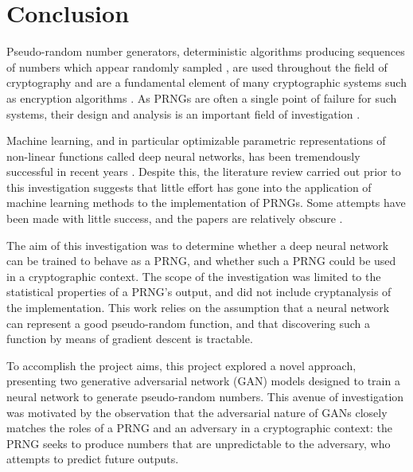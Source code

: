 \documentclass[12pt, titlepage]{report}
\theoremstyle{definition}
\begin{document}
\chapter{Conclusion}\label{chapter:conclusion}
Pseudo-random number generators, deterministic algorithms producing sequences of numbers which appear randomly sampled \cite[p. 7]{barker2007recommendation}, are used throughout the field of cryptography and are a fundamental element of many cryptographic systems such as encryption algorithms  \cite[p. 169]{menezes1996handbook} \cite[p. 1]{kelsey1998cryptanalytic}. As PRNGs are often a single point of failure for such systems, their design and analysis is an important field of investigation \cite[p. 2]{kelsey1998cryptanalytic} \cite{deng2017developments}. 

Machine learning, and in particular optimizable parametric representations of non-linear functions called deep neural networks, has been tremendously successful in recent years \cite[p. 24-29]{russel2009artificial}. Despite this, the literature review carried out prior to this investigation suggests that little effort has gone into the application of machine learning methods to the implementation of PRNGs. Some attempts have been made with little success, and the papers are relatively obscure \cite{desai2011pseudo} \cite{desai2012pseudo} \cite{tirdad2010hopfield}.

The aim of this investigation was to determine whether a deep neural network can be trained to behave as a PRNG, and whether such a PRNG could be used in a cryptographic context. The scope of the investigation was limited to the statistical properties of a PRNG's output, and did not include cryptanalysis of the implementation. This work relies on the assumption that a neural network can represent a good pseudo-random function, and that discovering such a function by means of gradient descent is tractable. 

To accomplish the project aims, this project explored a novel approach, presenting two generative adversarial network (GAN) models designed to train a neural network to generate pseudo-random numbers. This avenue of investigation was motivated by the observation that the adversarial nature of GANs closely matches the roles of a PRNG and an adversary in a cryptographic context: the PRNG seeks to produce numbers that are unpredictable to the adversary, who attempts to predict future outputs. 
\end{document}

